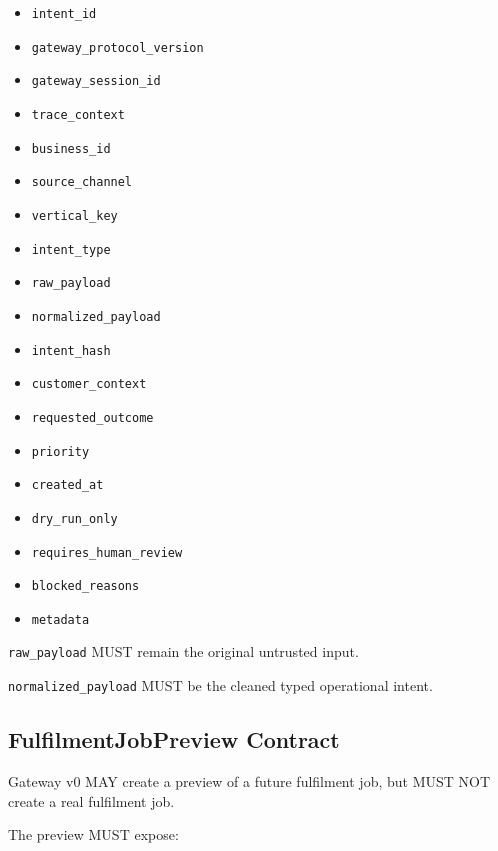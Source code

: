 \begin{itemize}
  \item \texttt{intent\_id}
  \item \texttt{gateway\_protocol\_version}
  \item \texttt{gateway\_session\_id}
  \item \texttt{trace\_context}
  \item \texttt{business\_id}
  \item \texttt{source\_channel}
  \item \texttt{vertical\_key}
  \item \texttt{intent\_type}
  \item \texttt{raw\_payload}
  \item \texttt{normalized\_payload}
  \item \texttt{intent\_hash}
  \item \texttt{customer\_context}
  \item \texttt{requested\_outcome}
  \item \texttt{priority}
  \item \texttt{created\_at}
  \item \texttt{dry\_run\_only}
  \item \texttt{requires\_human\_review}
  \item \texttt{blocked\_reasons}
  \item \texttt{metadata}
\end{itemize}

\texttt{raw\_payload} MUST remain the original untrusted input.

\texttt{normalized\_payload} MUST be the cleaned typed operational intent.

\subsection{FulfilmentJobPreview Contract}

Gateway v0 MAY create a preview of a future fulfilment job, but MUST NOT create a real fulfilment job.

The preview MUST expose:

